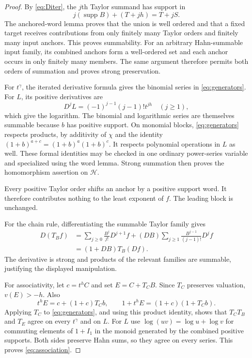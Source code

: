 \documentclass[11pt,a4paper]{article}
\theoremstyle{definition}
\theoremstyle{remark}
\newcommand{\HH}{\mathscr H}
\newcommand{\supp}{\operatorname{supp}}
\begin{document}
\begin{proof}
By \eqref{eq:Diter}, the $j$th Taylor summand has support in
\[
 j(\supp B)+(T+jh)=T+jS.
\]
The anchored-word lemma proves that the union is well ordered and that a
fixed target receives contributions from only finitely many Taylor orders
and finitely many input anchors. This proves summability. For an arbitrary
Hahn-summable input family, its combined anchors form a well-ordered set
and each anchor occurs in only finitely many members. The same argument
therefore permits both orders of summation and proves strong preservation.

For $t^\gamma$, the iterated derivative formula gives the binomial series
in \eqref{eq:generators}. For $L$, its positive derivatives are
\[
 D^jL=(-1)^{j-1}(j-1)!t^{jh}\quad(j\ge1),
\]
which give the logarithm. The binomial and logarithmic series are themselves
summable because $b$ has positive support. On monomial blocks,
\eqref{eq:generators} respects products, by additivity of $\chi$ and the
identity $(1+b)^{a+c}=(1+b)^a(1+b)^c$. It respects polynomial operations in
$L$ as well. These formal identities may be checked in one ordinary
power-series variable and specialized using the word lemma. Strong
summation then proves the homomorphism assertion on $\HH$.

Every positive Taylor order shifts an anchor by a positive support word.
It therefore contributes nothing to the least exponent of $f$.
The leading block is unchanged.

For the chain rule, differentiating the summable Taylor family gives
\[
 \begin{split}
 D(T_Bf)
 &=\sum_{j\ge0}\frac{B^j}{j!}D^{j+1}f
   +(DB)\sum_{j\ge1}\frac{B^{j-1}}{(j-1)!}D^jf\\
 &=(1+DB)T_B(Df).
 \end{split}
\]
The derivative is strong and products of the relevant families are
summable, justifying the displayed manipulation.

For associativity, let $c=t^hC$ and set $E=C+T_CB$.
Since $T_C$ preserves valuation, $v(E)>-h$. Also
\[
 t^hE=c+(1+c)T_Cb,
 \qquad 1+t^hE=(1+c)(1+T_Cb).
\]
Applying $T_C$ to \eqref{eq:generators}, and using this product identity,
shows that $T_CT_B$ and $T_E$ agree on every $t^\gamma$ and on $L$.
For $L$ use $\log(uv)=\log u+\log v$ for commuting elements of $1+I_1$
in the monoid generated by the combined positive supports. Both sides
preserve Hahn sums, so they agree on every series. This proves
\eqref{eq:association}.
\end{proof}
\end{document}
